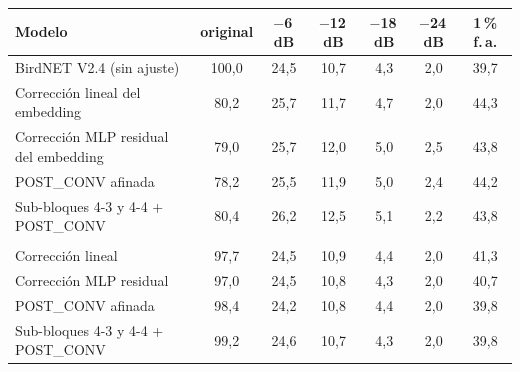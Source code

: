 \begin{tabular}{lcccccc}
\toprule
Modelo & original & $-$6\,dB & $-$12\,dB & $-$18\,dB & $-$24\,dB & 1\,\% f.\,a.\\
\midrule
BirdNET V2.4 (sin ajuste) & 100{,}0 & 24{,}5 & 10{,}7 & 4{,}3 & 2{,}0 & 39{,}7\\
\addlinespace
Correcci\'on lineal del embedding & 80{,}2 & 25{,}7 & 11{,}7 & 4{,}7 & 2{,}0 & 44{,}3\\
Correcci\'on MLP residual del embedding & 79{,}0 & 25{,}7 & 12{,}0 & 5{,}0 & 2{,}5 & 43{,}8\\
POST\_CONV afinada & 78{,}2 & 25{,}5 & 11{,}9 & 5{,}0 & 2{,}4 & 44{,}2\\
Sub-bloques 4-3 y 4-4 + POST\_CONV & 80{,}4 & 26{,}2 & 12{,}5 & 5{,}1 & 2{,}2 & 43{,}8\\
\addlinespace
\multicolumn{7}{l}{\emph{Correcci\'on acotada}}\\
Correcci\'on lineal & 97{,}7 & 24{,}5 & 10{,}9 & 4{,}4 & 2{,}0 & 41{,}3\\
Correcci\'on MLP residual & 97{,}0 & 24{,}5 & 10{,}8 & 4{,}3 & 2{,}0 & 40{,}7\\
POST\_CONV afinada & 98{,}4 & 24{,}2 & 10{,}8 & 4{,}4 & 2{,}0 & 39{,}8\\
Sub-bloques 4-3 y 4-4 + POST\_CONV & 99{,}2 & 24{,}6 & 10{,}7 & 4{,}3 & 2{,}0 & 39{,}8\\
\bottomrule
\end{tabular}
